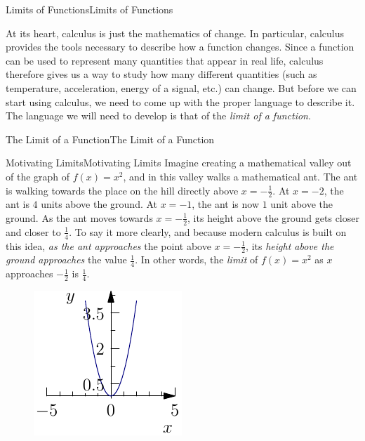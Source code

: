 \documentclass[10pt,]{book}
\numberwithin{equation}{section}
\begin{document}
%
%
\typeout{************************************************}
\typeout{************************************************}
%
\begin{chapterptx}{Limits of Functions}{}{Limits of Functions}{}{}\label{limits}
\begin{introduction}{}%
\hypertarget{p-1}{}%
At its heart, calculus is just the mathematics of change. In particular, calculus provides the tools necessary to describe how a function changes. Since a function can be used to represent many quantities that appear in real life, calculus therefore gives us a way to study how many different quantities (such as temperature, acceleration, energy of a signal, etc.) can change. But before we can start using calculus, we need to come up with the proper language to describe it. The language we will need to develop is that of the \emph{limit of a function}.%
\end{introduction}%
%
%
\typeout{************************************************}
\typeout{************************************************}
%
\begin{sectionptx}{The Limit of a Function}{}{The Limit of a Function}{}{}\label{section-the-limit-of-a-function}
%
%
\typeout{************************************************}
\typeout{************************************************}
%
\begin{subsectionptx}{Motivating Limits}{}{Motivating Limits}{}{}\label{subsection-motivating-limits}
\hypertarget{p-2}{}%
Imagine creating a mathematical valley out of the graph of \(f(x) = x^{2}\), and in this valley walks a mathematical ant. The ant is walking towards the place on the hill directly above \(x = -\frac{1}{2}\). At \(x=-2\), the ant is \(4\) units above the ground. At \(x=-1\), the ant is now \(1\) unit above the ground. As the ant moves towards \(x=-\frac{1}{2}\), its height above the ground gets closer and closer to \(\frac{1}{4}\). To say it more clearly, and because modern calculus is built on this idea, \emph{as the ant approaches} the point above \(x = -\frac{1}{2}\), its \emph{height above the ground approaches} the value \(\frac{1}{4}\). In other words, the \emph{limit} of \(f(x) = x^{2}\) as \(x\) approaches \(-\frac{1}{2}\) is \(\frac{1}{4}\).%
\begin{figure}
\centering
\includegraphics[width=0.5\linewidth]{images/image-1.pdf}

\end{figure}
\end{subsectionptx}
\end{sectionptx}
\end{chapterptx}
\end{document}
